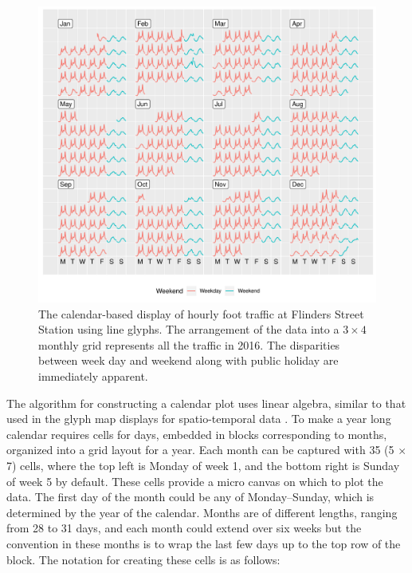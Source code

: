 \documentclass[12pt]{article}
\begin{document}
\begin{figure}

{\centering \includegraphics[width=\textwidth]{figure/flinders-2016-1} 

}

\caption{The calendar-based display of hourly foot traffic at Flinders Street Station using line glyphs. The arrangement of the data into a $3 \times 4$ monthly grid represents all the traffic in 2016. The disparities between week day and weekend along with public holiday are immediately apparent.}\label{fig:flinders-2016}
\end{figure}

The algorithm for constructing a calendar plot uses linear algebra,
similar to that used in the glyph map displays for spatio-temporal data
\citep{Wickham2012glyph}. To make a year long calendar requires cells
for days, embedded in blocks corresponding to months, organized into a
grid layout for a year. Each month can be captured with 35 (5 \(\times\)
7) cells, where the top left is Monday of week 1, and the bottom right
is Sunday of week 5 by default. These cells provide a micro canvas on
which to plot the data. The first day of the month could be any of
Monday--Sunday, which is determined by the year of the calendar. Months
are of different lengths, ranging from 28 to 31 days, and each month
could extend over six weeks but the convention in these months is to
wrap the last few days up to the top row of the block. The notation for
creating these cells is as follows:
\end{document}
